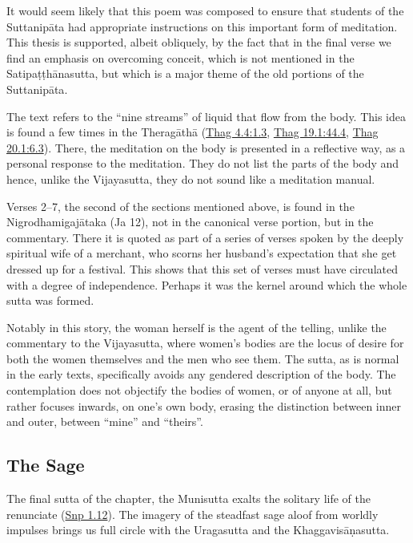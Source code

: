\documentclass[12pt,openany]{book}%
\begin{document}
It would seem likely that this poem was composed to ensure that students of the \textsanskrit{Suttanipāta} had appropriate instructions on this important form of meditation. This thesis is supported, albeit obliquely, by the fact that in the final verse we find an emphasis on overcoming conceit, which is not mentioned in the \textsanskrit{Satipaṭṭhānasutta}, but which is a major theme of the old portions of the \textsanskrit{Suttanipāta}.

The text refers to the “nine streams” of liquid that flow from the body. This idea is found a few times in the \textsanskrit{Theragāthā} (\href{https://suttacentral.net/thag4.4/en/sujato\#1.3}{Thag 4.4:1.3}, \href{https://suttacentral.net/thag19.1/en/sujato\#44.4}{Thag 19.1:44.4}, \href{https://suttacentral.net/thag20.1/en/sujato\#6.3}{Thag 20.1:6.3}). There, the meditation on the body is presented in a reflective way, as a personal response to the meditation. They do not list the parts of the body and hence, unlike the Vijayasutta, they do not sound like a meditation manual.

Verses 2–7, the second of the sections mentioned above, is found in the \textsanskrit{Nigrodhamigajātaka} (Ja 12), not in the canonical verse portion, but in the commentary. There it is quoted as part of a series of verses spoken by the deeply spiritual wife of a merchant, who scorns her husband’s expectation that she get dressed up for a festival. This shows that this set of verses must have circulated with a degree of independence. Perhaps it was the kernel around which the whole sutta was formed.

Notably in this story, the woman herself is the agent of the telling, unlike the commentary to the Vijayasutta, where women’s bodies are the locus of desire for both the women themselves and the men who see them. The sutta, as is normal in the early texts, specifically avoids any gendered description of the body. The contemplation does not objectify the bodies of women, or of anyone at all, but rather focuses inwards, on one’s own body, erasing the distinction between inner and outer, between “mine” and “theirs”.

\subsection*{The Sage}

The final sutta of the chapter, the Munisutta exalts the solitary life of the renunciate (\href{https://suttacentral.net/snp1.12/en/sujato}{Snp 1.12}). The imagery of the steadfast sage aloof from worldly impulses brings us full circle with the Uragasutta and the \textsanskrit{Khaggavisāṇasutta}.
\end{document}
